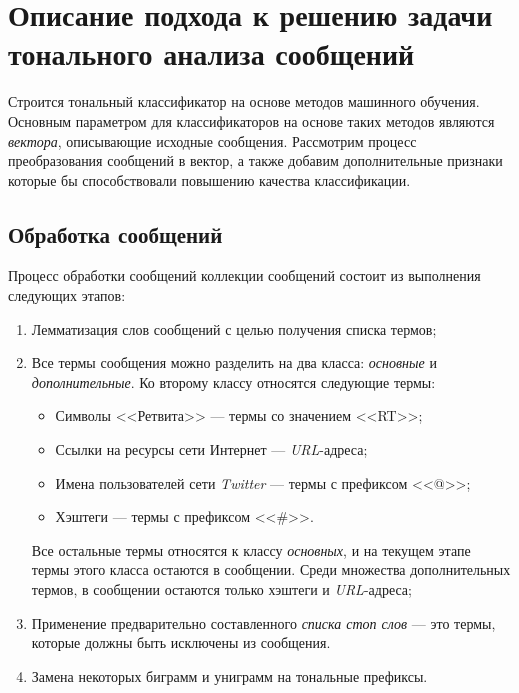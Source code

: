 \newpage
    \section{Описание подхода к решению задачи тонального анализа сообщений}
    \label{sec:buildingApproachDescription}
    Строится тональный классификатор на основе методов машинного обучения.
    Основным параметром для классификаторов на основе таких методов
    являются {\it вектора}, описывающие исходные сообщения.
    Рассмотрим процесс преобразования сообщений в вектор, а также добавим
    дополнительные признаки которые бы способствовали повышению качества
    классификации.

    \subsection{Обработка сообщений}
    \label{sec:buildingMsgProcessing}
    Процесс обработки сообщений коллекции сообщений состоит из выполнения
    следующих этапов:
    \begin{enumerate}
        \item Лемматизация слов сообщений с целью получения списка термов;

        \item Все термы сообщения можно разделить на два класса: {\it основные} и
            {\it дополнительные}.
            Ко второму классу относятся следующие термы:
            \begin{itemize}
                \item Символы <<Ретвита>> --- термы со значением <<RT>>;
                \item Ссылки на ресурсы сети Интернет --- {\it URL\hspace{1pt}}-адреса;
                \item Имена пользователей сети {\it Twitter} --- термы с префиксом <<@>>;
                \item Хэштеги --- термы с префиксом <<\#>>.
            \end{itemize}
            Все остальные термы относятся к классу {\it основных}, и на текущем этапе
            термы этого класса остаются в сообщении. Среди множества дополнительных
            термов, в сообщении остаются только хэштеги и {\it URL\hspace{1pt}}-адреса;

        \item Применение предварительно составленного {\it списка стоп слов} ---
            это термы, которые должны быть исключены из сообщения.
        \item Замена некоторых биграмм и униграмм на тональные префиксы.
    \end{enumerate}

